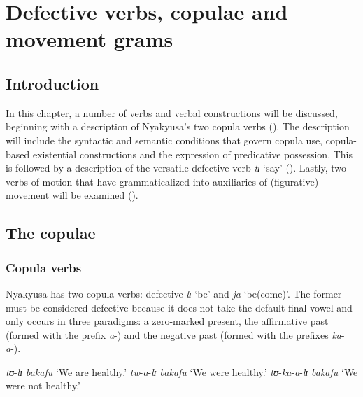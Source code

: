 \chapter{Defective verbs, copulae and movement grams}\label{DefectiveVerbsCopulae}
\section{Introduction}
In this chapter, a number of verbs and verbal constructions will be discussed, beginning with a description of Nyakyusa's two copula verbs (). The description will include the syntactic and semantic conditions that govern copula use, copula-based existential constructions and the expression of predicative possession. This is followed by a description of the versatile defective verb \textit{tɪ} \lq say' (). Lastly, two verbs of motion that have grammaticalized into auxiliaries of (figurative) movement will be examined ().

\section{The copulae}
\subsection{Copula verbs}
\label{Copulae}
Nyakyusa has two copula verbs: defective \textit{lɪ} \lq be' and \textit{ja} \lq be(come)'. The former must be considered defective because it does not take the default final vowel and only occurs in three paradigms: a zero-marked present, the affirmative past (formed with the prefix \textit{a}-) and the negative past (formed with the prefixes \textit{ka}-\textit{a}-).

\begin{exe}
\ex
\begin{xlist}
\ex \textit{tʊ}-\textit{lɪ bakafu} `We are healthy.'
\ex \textit{tw}-\textit{a}-\textit{lɪ bakafu} `We were healthy.'
\ex \textit{tʊ}-\textit{ka}-\textit{a}-\textit{lɪ} \textit{bakafu} `We were not healthy.'
\end{xlist}
\end{exe}

